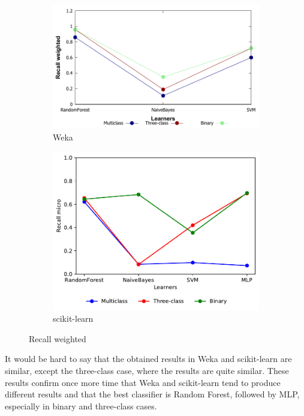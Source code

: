 \begin{figure}[H]
    \centering
    \begin{subfigure}[t]{0.5\textwidth}
        \includegraphics[width=\linewidth]{images/weka_recallweight}
        \caption{Weka}
    \end{subfigure}%
    \begin{subfigure}[t]{0.42\textwidth}
        \includegraphics[width=\linewidth, page = 3]{images/recall}
        \caption{scikit-learn}
    \end{subfigure}
    \caption{Recall weighted}
    \label{fig:recall_weight}
\end{figure}

It would be hard to say that the obtained results in Weka and scikit-learn are similar, except the three-class case, where the results are quite similar. These results confirm once more time that Weka and scikit-learn tend to produce different results and that the best classifier is Random Forest, followed by MLP, especially in binary and three-class cases.

